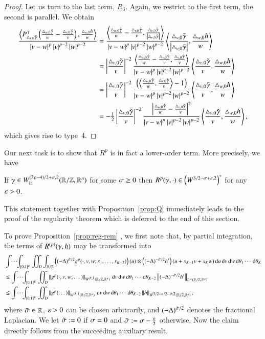 \begin{proof}
Let us turn to the last term, $R_3$.
Again, we restrict to the first term, the second is parallel.
We obtain
\begin{align*}
 \frac{\sp{P^{\top}_{\T v0}
\left( \frac{ \T w0 } w - \frac{ \T v0 } v \right),\frac{\T[h] w0}w}}{\abs{v-w}^p\abs{v}^{p-2}\abs{w}^{p-2}}
&= \frac{\sp{\frac{ \T w0 } w - \frac{ \T v0 } v,\fracabs{\T v0}}}{\abs{v-w}^p\abs{v}^{p-2}\abs{w}^{p-2}}\sp{\fracabs{\T v0} ,\frac{\T[h] w0}w} \\
&= \abs{\frac{\T v0}v}^{-2}\frac{\sp{\frac{ \T w0 } w - \frac{ \T v0 } v,\frac{\T v0}v}}{\abs{v-w}^p\abs{v}^{p-2}\abs{w}^{p-2}} \sp{\frac{\T v0}v ,\frac{\T[h] w0}w}\\
&= \abs{\frac{\T v0}v}^{-2}\frac{\br{\sp{\frac{ \T w0 } w , \frac{ \T v0 } v}-1}}{\abs{v-w}^p\abs{v}^{p-2}\abs{w}^{p-2}} \sp{\frac{\T v0}v ,\frac{\T[h] w0}w} \\
&= -\tfrac12\abs{\frac{\T v0}v}^{-2}\frac{{\abs{\frac{ \T w0 } w - \frac{ \T v0 } v}^{2}}}{\abs{v-w}^p\abs{v}^{p-2}\abs{w}^{p-2}} \sp{\frac{\T v0}v ,\frac{\T[h] w0}w},
\end{align*}
which gives rise to type~4.
\end{proof}


 Our next task is to show that
  $R^p$
 is in fact a lower-order term. More precisely, we have
 
 \begin{proposition}\label{prop:reg-rem}
  If $\g\in\Wia[(3p-4)/2+\s,2]\rzd$ for some $\s\ge0$ then
  $R^p(\g,\cdot)\in\br{\W[3/2-\s+\eps,2]}^{*}$ for any $\eps>0$.
 \end{proposition}
 
 This statement together with Proposition~\ref{prop:Q} immediately leads to
 the proof of the regularity theorem which is deferred to the end of
 this section.
 
 To prove Proposition~\ref{prop:reg-rem}%
 , we first note that,
 by partial integration, the terms of $\Re[](\g,h)$ may be transformed into
\begin{align*}
  &\idotsint_{[0,1]^{K}}\iint_{D}\int_{\R/\Z}
   \br{(-\Delta)^{\tilde\s/2}\gp(\cdot,v,w;s_{1},\dots,s_{K-2})}(u) \otimes\br{(-\Delta)^{-\tilde\s/2}\dh}(u+s_{K-1}v+s_{K}w)
   \d u\d v\d w \d\theta_{1}\cdots\d\theta_{K} \\
  &\le \idotsint_{[0,1]^{K}}
  \iint_{D}\norm{\gp (\cdot,v, w;\dots)}_{\W[\tilde\s,1]\rzd}\d v\d w
  \d\theta_{1}\cdots\d\theta_{K-2} \norm{(-\Delta)^{-\tilde\s/2}\dh}_{L^{\infty}\rzd} \\
 &\le \idotsint_{[0,1]^{K}}
  \iint_{D}\norm{\gp (\dots)}_{\W[\tilde\s,1]\rzd}\d v \d w
  \d\theta_{1}\cdots\d\theta_{K-2}\norm{h}_{\W[3/2+\eps/2-\tilde\s,2]\rzd},
 \end{align*}
  where $\tilde\s\in\R$, $\eps>0$ can be chosen arbitrarily, and $(-\Delta)^{\tilde\s/2}$ denotes the fractional
  Laplacian.
  We let $\tilde\s:=0$ if $\s=0$ and $\tilde\s:=\s-\frac\eps2$ otherwise.
  Now the claim directly follows from the succeeding auxiliary result.
 
